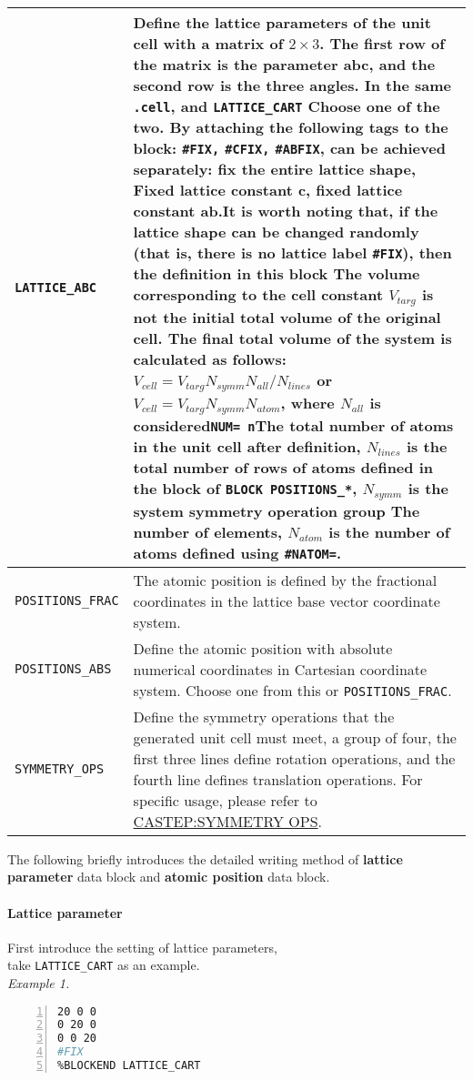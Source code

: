 \documentclass[a4paper, 10pt]{article}
\begin{document}
\begin{center}
\begin{longtable}{m{13em}<{\centering} | m{19em}}
\midrule
\verb|LATTICE_ABC| & Define the lattice parameters of the unit cell with a matrix of \(2\times3\). The first row of the matrix is the parameter abc, and the second row is the three angles. In the same \verb|.cell|, and \verb |LATTICE_CART| Choose one of the two. By attaching the following tags to the block: \verb|#FIX,| \verb|#CFIX,| \verb|#ABFIX|, can be achieved separately: fix the entire lattice shape, Fixed lattice constant c, fixed lattice constant ab.\textbf{It is worth noting that}, if the lattice shape can be changed randomly (that is, there is no lattice label \verb|#FIX|), then the definition in this block The volume corresponding to the cell constant \(V_{targ}\) \textbf{is not} the initial total volume of the original cell. The final total volume of the system is calculated as follows: \(V_{cell} = V_{targ} N_{symm} N_{all} / N_{lines}\) or \(V_{cell} = V_{targ} N_{symm} N_{atom} \), where \(N_{all}\) is considered\verb|NUM= n|The total number of atoms in the unit cell after definition, \(N_{lines}\) is the total number of rows of atoms defined in the block of \verb|BLOCK POSITIONS_*|, \(N_{symm}\) is the system symmetry operation group The number of elements, \(N_{atom}\) is the number of atoms defined using \verb|#NATOM=|.\\
\midrule
\verb|POSITIONS_FRAC| & The atomic position is defined by the fractional coordinates in the lattice base vector coordinate system.\\
\midrule
\verb|POSITIONS_ABS| & Define the atomic position with absolute numerical coordinates in Cartesian coordinate system. Choose one from this or \verb|POSITIONS_FRAC|.\\
\midrule
\verb|SYMMETRY_OPS| & Define the symmetry operations that the generated unit cell must meet, a group of four, the first three lines define rotation operations, and the fourth line defines translation operations. For specific usage, please refer to \href{http://www.tcm.phy.cam.ac.uk/castep/documentation/WebHelp/content/modules/castep/keywords/k_symmetry_ops_castep.htm}{CASTEP:SYMMETRY OPS}.\\
\bottomrule
\end{longtable}
\end{center}

The following briefly introduces the detailed writing method of \textbf{lattice parameter} data block and \textbf{atomic position} data block.

\paragraph{Lattice parameter} First introduce the setting of lattice parameters, \\take \verb|LATTICE_CART| as an example.\\
\emph{Example 1.}
\begin{lstlisting}[language={bash},numbers=left]
%BLOCK LATTICE_CART
20 0 0
0 20 0
0 0 20
#FIX
%BLOCKEND LATTICE_CART
\end{lstlisting}
\end{document}
